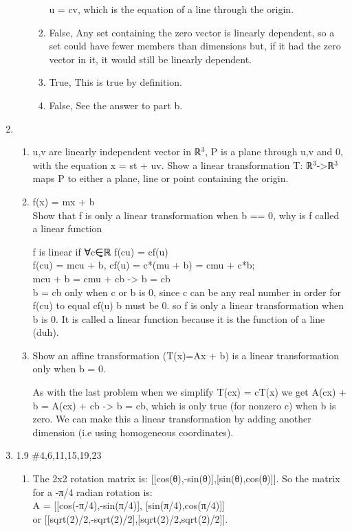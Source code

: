 \documentclass[11pt]{article}
\begin{document}
\begin{enumerate}
\begin{enumerate}
\begin{enumerate}
u = cv, which is the equation of a line through the origin.
\item False, Any set containing the zero vector is linearly dependent, so
a set could have fewer members than dimensions but, if it had the zero
vector in it, it would still be linearly dependent.
\item True, This is true by definition.
\item False, See the answer to part b.
\end{enumerate}
\end{enumerate}
\item \begin{enumerate}
\item u,v are linearly independent vector in ℝ\(^{\text{3}}\), P is a plane through
u,v and 0, with the equation x = st + uv.
Show a linear transformation T: ℝ\(^{\text{3}}\)->ℝ\(^{\text{3}}\) maps P to either a plane,
line or point containing the origin.
\item f(x) = mx + b\\
Show that f is only a linear transformation when b == 0, why is f
called a linear function

f is linear if ∀c∈̱ℝ f(cu) = cf(u)\\
f(cu) = mcu + b, cf(u) = c*(mu + b) = cmu + c*b;\\
mcu + b = cmu + cb -> b = cb\\
b = cb only when c or b is 0, since c can be any real number in order
for f(cu) to equal cf(u) b must be 0. so f is only a linear
transformation when b is 0. It is called a linear function because it is
the function of a line (duh).

\item Show an affine transformation (T(x)=Ax + b) is a linear transformation
only when b = 0.

As with the last problem when we simplify T(cx) = cT(x) we get
A(cx) + b = A(cx) + cb -> b = cb, which is only true (for nonzero c)
when b is zero. We can make this a linear transformation by adding
another dimension (i.e using homogeneous coordinates).
\end{enumerate}

\item 1.9 \#4,6,11,15,19,23
\begin{enumerate}
\item The 2x2 rotation matrix is: [[cos(θ),-sin(θ)],[sin(θ),cos(θ)]].
So the matrix for a -π/4 radian rotation is:\\
A = [[cos(-π/4),-sin(π/4)], [sin(π/4),cos(π/4)]]\\
or [[sqrt(2)/2,-sqrt(2)/2],[sqrt(2)/2,sqrt(2)/2]].


\end{enumerate}
\end{enumerate}
\end{document}
